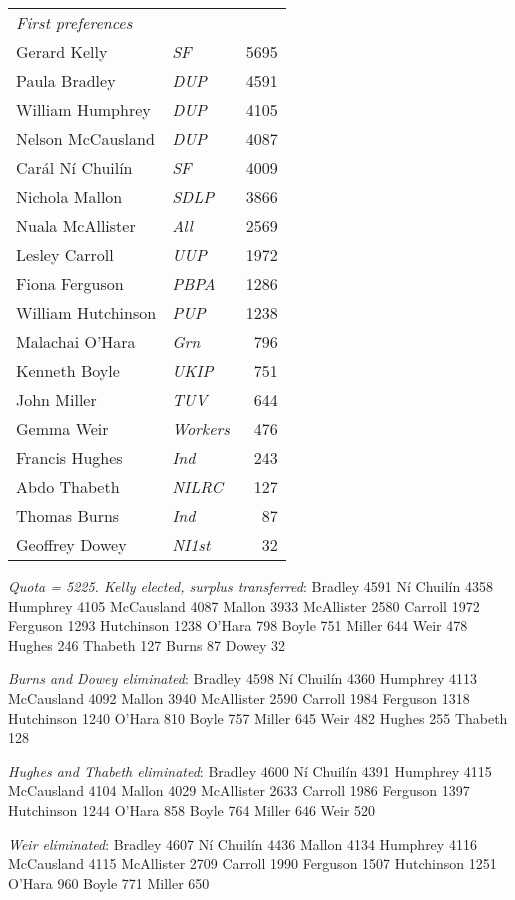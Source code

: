 \begin{resultsiii}
\noindent
\begin{tabular*}{\columnwidth}{@{\extracolsep{\fill}} p{} >{\itshape}l r @{\extracolsep{\fill}}}
\emph{First preferences}\\
Gerard Kelly & SF & 5695\\
Paula Bradley & DUP & 4591\\
William Humphrey & DUP & 4105\\
Nelson McCausland & DUP & 4087\\
Carál Ní Chuilín & SF & 4009\\
Nichola Mallon & SDLP & 3866\\
Nuala McAllister & All & 2569\\
Lesley Carroll & UUP & 1972\\
Fiona Ferguson & PBPA & 1286\\
William Hutchinson & PUP & 1238\\
Malachai O'Hara & Grn & 796\\
Kenneth Boyle & UKIP & 751\\
John Miller & TUV & 644\\
Gemma Weir & Workers & 476\\
Francis Hughes & Ind & 243\\
Abdo Thabeth & NILRC & 127\\
Thomas Burns & Ind & 87\\
Geoffrey Dowey & NI1st & 32\\
\end{tabular*}

\emph{Quota = 5225.  Kelly elected, surplus transferred}: Bradley 4591 Ní Chuilín 4358 Humphrey 4105 McCausland 4087 Mallon 3933 McAllister 2580 Carroll 1972 Ferguson 1293 Hutchinson 1238 O'Hara 798 Boyle 751 Miller 644 Weir 478 Hughes 246 Thabeth 127 Burns 87 Dowey 32

\emph{Burns and Dowey eliminated}: Bradley 4598 Ní Chuilín 4360 Humphrey 4113 McCausland 4092 Mallon 3940 McAllister 2590 Carroll 1984 Ferguson 1318 Hutchinson 1240 O'Hara 810 Boyle 757 Miller 645 Weir 482 Hughes 255 Thabeth 128

\emph{Hughes and Thabeth eliminated}: Bradley 4600 Ní Chuilín 4391 Humphrey 4115 McCausland 4104 Mallon 4029 McAllister 2633 Carroll 1986 Ferguson 1397 Hutchinson 1244 O'Hara 858 Boyle 764 Miller 646 Weir 520

\emph{Weir eliminated}: Bradley 4607 Ní Chuilín 4436 Mallon 4134 Humphrey 4116 McCausland 4115 McAllister 2709 Carroll 1990 Ferguson 1507 Hutchinson 1251 O'Hara 960 Boyle 771 Miller 650


\end{resultsiii}
